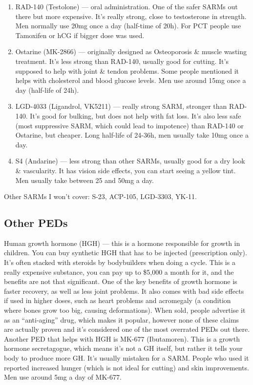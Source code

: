 \documentclass[openany, 12pt]{book}
\begin{document}
        \begin{enumerate}
		\item RAD-140 (Testolone) --- oral administration. One of the safer SARMs out there but more expensive. It's really strong, close to testosterone in strength. 
                  Men normally use 20mg once a day (half-time of 20h). For PCT people use Tamoxifen or hCG if bigger dose was used.
		\item Ostarine (MK-2866) --- originally designed as Osteoporosis \& muscle wasting treatment. It's less strong than RAD-140, usually good for cutting. It's supposed to help
                  with joint \& tendon problems. Some people mentioned it helps with cholesterol and blood glucose levels. Men use around 15mg once a day (half-life of 24h).
		\item LGD-4033 (Ligandrol, VK5211) --- really strong SARM, stronger than RAD-140. It's good for bulking, but does not help with fat loss.
                  It's also less safe (most suppressive SARM, which could lead
                  to impotence) than RAD-140 or Ostarine, but cheaper. Long half-life of 24-36h, men usually take 10mg once a day.
		\item S4 (Andarine) --- less strong than other SARMs, usually good for a dry look \& vascularity. It has vision side effects, you can start seeing a yellow tint.
                  Men usually take between 25 and 50mg a day.
        \end{enumerate}

        Other SARMs I won't cover: S-23, ACP-105, LGD-3303, YK-11.

        \subsection{Other PEDs}

        Human growth hormone (HGH) --- this is a hormone responsible for growth in children. You can buy synthetic HGH that has to be injected (prescription only). 
        It's often stacked with steroids by bodybuilders when doing a cycle.
        This is a really expensive substance, you can pay up to \$5,000 a month for it, and the benefits are not that significant.
        One of the key benefits of growth hormone is faster recovery, as well as less joint problems.
        It also comes with bad side effects if used in higher doses, such as heart problems and acromegaly (a condition where bones grow too big, causing deformations).
        When sold, people advertise it as an ``anti-aging'' drug, which makes it popular, however none of these claims are actually proven and it's considered one of the
        most overrated PEDs out there. Another PED that helps with HGH is
        MK-677 (Ibutamoren). This is a growth hormone secretagogue, which means it's not a GH itself, but rather it tells your body to produce more GH. It's usually mistaken
        for a SARM. People who used it reported increased hunger (which is not ideal for cutting) and skin improvements. Men use around 5mg a day of MK-677.
\end{document}
